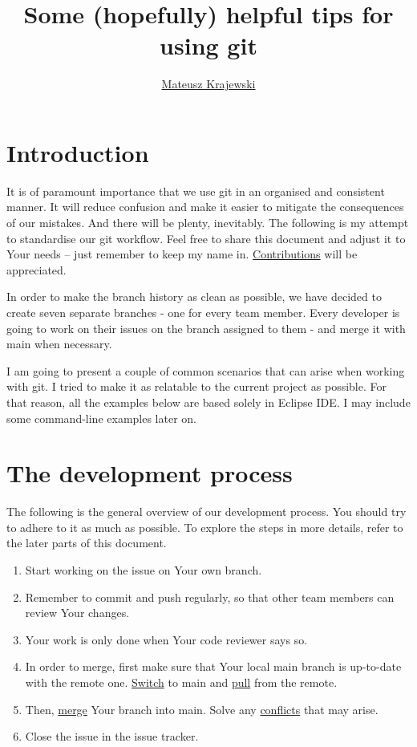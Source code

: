 \documentclass{article}
\title{Some (hopefully) helpful tips for using git}
\author{\href{https://www.linkedin.com/in/mkrajewski14/}{Mateusz Krajewski}}
\begin{document}
\maketitle
\tableofcontents
\newpage

\section{Introduction} 
It is of paramount importance that we use git in an organised and consistent manner. It will reduce confusion and make it easier to mitigate the consequences of our mistakes. And there will be plenty, inevitably. The following is my attempt to standardise our git workflow. Feel free to share this document and adjust it to Your needs -- just remember to keep my name in. \hyperref[sec:contributing]{Contributions} will be appreciated.

In order to make the branch history as clean as possible, we have decided to create seven separate branches - one for every team member. Every developer is going to work on their issues on the branch assigned to them - and merge it with main when necessary.

I am going to present a couple of common scenarios that can arise when working with git. I tried to make it as relatable to the current project as possible. For that reason, all the examples below are based solely in Eclipse IDE. I may include some command-line examples later on.

\section{The development process}

The following is the general overview of our development process. You should try to adhere to it as much as possible. To explore the steps in more details, refer to the later parts of this document.

\begin{enumerate}
	\item Start working on the issue on Your own branch.
	\item Remember to commit and push regularly, so that other team members can review Your changes.
	\item Your work is only done when Your code reviewer says so.
	\item In order to merge, first make sure that Your local main branch is up-to-date with the remote one. \hyperref[sec:switching]{Switch} to main and \hyperref[sec:pulling]{pull} from the remote.
	\item Then, \hyperref[sec:merging]{merge} Your branch into main. Solve any \hyperref[sec:conflicts]{conflicts} that may arise.
	\item Close the issue in the issue tracker.
\end{enumerate}
\end{document}
